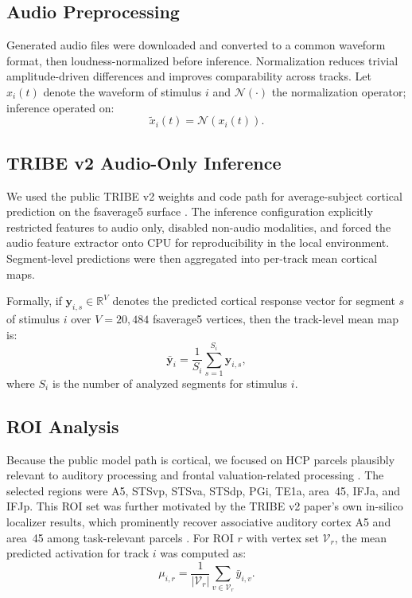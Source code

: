 \documentclass[conference]{IEEEtran}
\begin{document}
\subsection{Audio Preprocessing}

Generated audio files were downloaded and converted to a common waveform format, then loudness-normalized before inference. Normalization reduces trivial amplitude-driven differences and improves comparability across tracks. Let $x_i(t)$ denote the waveform of stimulus $i$ and $\mathcal{N}(\cdot)$ the normalization operator; inference operated on:
\begin{equation}
\tilde{x}_i(t) = \mathcal{N}\left(x_i(t)\right).
\end{equation}

\subsection{TRIBE v2 Audio-Only Inference}

We used the public TRIBE v2 weights and code path for average-subject cortical prediction on the fsaverage5 surface \cite{tribev2}. The inference configuration explicitly restricted features to audio only, disabled non-audio modalities, and forced the audio feature extractor onto CPU for reproducibility in the local environment. Segment-level predictions were then aggregated into per-track mean cortical maps.

Formally, if $\mathbf{y}_{i,s} \in \mathbb{R}^{V}$ denotes the predicted cortical response vector for segment $s$ of stimulus $i$ over $V=20{,}484$ fsaverage5 vertices, then the track-level mean map is:
\begin{equation}
\bar{\mathbf{y}}_i = \frac{1}{S_i}\sum_{s=1}^{S_i}\mathbf{y}_{i,s},
\label{eq:trackmean}
\end{equation}
where $S_i$ is the number of analyzed segments for stimulus $i$.

\subsection{ROI Analysis}

Because the public model path is cortical, we focused on HCP parcels plausibly relevant to auditory processing and frontal valuation-related processing \cite{glasser2016}. The selected regions were A5, STSvp, STSva, STSdp, PGi, TE1a, area~45, IFJa, and IFJp. This ROI set was further motivated by the TRIBE v2 paper's own in-silico localizer results, which prominently recover associative auditory cortex A5 and area~45 among task-relevant parcels \cite{tribev2}. For ROI $r$ with vertex set $\mathcal{V}_r$, the mean predicted activation for track $i$ was computed as:
\begin{equation}
\mu_{i,r} = \frac{1}{|\mathcal{V}_r|}\sum_{v \in \mathcal{V}_r}\bar{y}_{i,v}.
\label{eq:roimean}
\end{equation}
\end{document}
